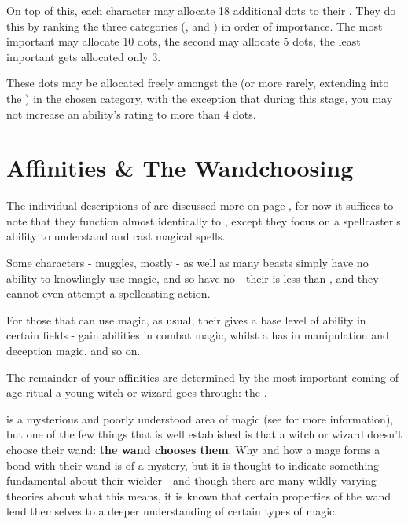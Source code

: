 On top of this, each character may allocate 18 additional dots to their . They do this by ranking the three categories (,  and ) in order of importance. The most important may allocate 10 dots, the second may allocate 5 dots, the least important gets allocated only 3.

These dots may be allocated freely amongst the  (or more rarely, extending into the ) in the chosen category, with the exception that during this stage, you may not increase an ability's rating to more than 4 dots. 


\section{Affinities \& The Wandchoosing} \label{S:Wandchoosing}

The individual descriptions of  are discussed more on page \pageref{S:DiscDescs}, for now it suffices to note that they function almost identically to , except they focus on a spellcaster's ability to understand and cast magical spells. 

Some characters - muggles, mostly - as well as many beasts simply have no ability to knowlingly use magic, and so have no  - their  is less than , and they cannot even attempt a spellcasting action. 

For those that can use magic, as usual, their  gives a base level of ability in certain fields -  gain abilities in combat magic, whilst a  has  in manipulation and deception magic, and so on. 

The remainder of your affinities are determined by the most important coming-of-age ritual a young witch or wizard goes through: the . 

 is a mysterious and poorly understood area of magic (see \pageref{S:Wandlore} for more information), but one of the few things that is well established is that a witch or wizard doesn't choose their wand: {\bf the wand chooses them}. Why and how a mage forms a bond with their wand is of a mystery, but it is thought to indicate something fundamental about their wielder - and though there are many wildly varying theories about what this means, it is known that certain properties of the wand lend themselves to a deeper understanding of certain types of magic. 

